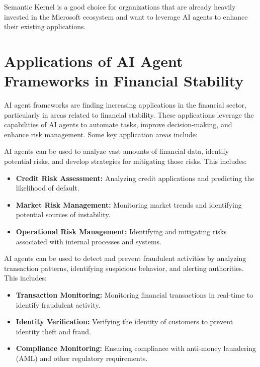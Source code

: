 \documentclass[a4paper,headinclude=on,footinclude=on,12pt,oneside]{scrbook}
\begin{document}
Semantic Kernel is a good choice for organizations that are already heavily invested in the Microsoft ecosystem and want to leverage AI agents to enhance their existing applications.

\section{Applications of AI Agent Frameworks in Financial Stability}

AI agent frameworks are finding increasing applications in the financial sector, particularly in areas related to financial stability. These applications leverage the capabilities of AI agents to automate tasks, improve decision-making, and enhance risk management. Some key application areas include:


AI agents can be used to analyze vast amounts of financial data, identify potential risks, and develop strategies for mitigating those risks. This includes:

\begin{itemize}
\item \textbf{Credit Risk Assessment:} Analyzing credit applications and predicting the likelihood of default.
\item \textbf{Market Risk Management:} Monitoring market trends and identifying potential sources of instability.
\item \textbf{Operational Risk Management:} Identifying and mitigating risks associated with internal processes and systems.
\end{itemize}


AI agents can be used to detect and prevent fraudulent activities by analyzing transaction patterns, identifying suspicious behavior, and alerting authorities. This includes:

\begin{itemize}
\item \textbf{Transaction Monitoring:} Monitoring financial transactions in real-time to identify fraudulent activity.
\item \textbf{Identity Verification:} Verifying the identity of customers to prevent identity theft and fraud.
\item \textbf{Compliance Monitoring:} Ensuring compliance with anti-money laundering (AML) and other regulatory requirements.
\end{itemize}
\end{document}
